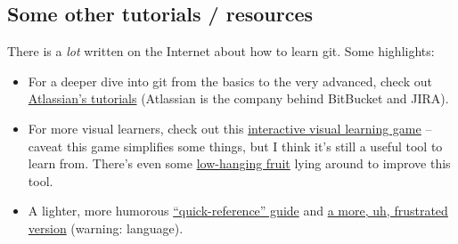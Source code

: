 \documentclass{article}
\begin{document}
\bigskip
\bigskip

\subsection*{Some other tutorials / resources}

There is a \emph{lot} written on the Internet about how to learn git. Some
highlights:

\begin{itemize}
  \item For a deeper dive into git from the basics to the very advanced, check
    out \href{https://www.atlassian.com/git/tutorials}{Atlassian's tutorials}
    (Atlassian is the company behind BitBucket and JIRA).
  \item For more visual learners, check out this
    \href{http://pcottle.github.io/learnGitBranching/}{interactive visual
    learning game} -- caveat this game simplifies some things, but I think
    it's still a useful tool to learn from.  There's even some
    \href{https://github.com/pcottle/learnGitBranching/issues/201}{low-hanging
    fruit} lying around to improve this tool.
  \item A lighter, more humorous
    \href{http://adriansampson.net/blog/git.html}{``quick-reference'' guide}
    and \href{http://ohshitgit.com/}{a more, uh, frustrated version} (warning:
    language).
\end{itemize}


\newpage
\end{document}
